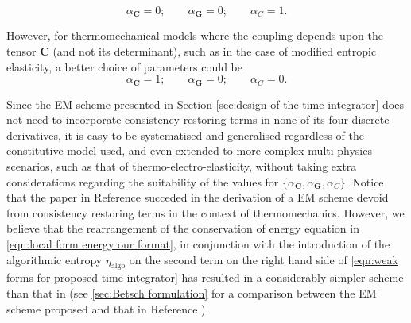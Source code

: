 {{%
\begin{equation}
\alpha_{\boldsymbol{C}}=0;\qquad
\alpha_{\boldsymbol{G}}=0;\qquad
\alpha_{{C}}=1. 
\end{equation}



However, for thermomechanical models where the coupling depends upon the tensor $\boldsymbol{C}$ (and not its determinant), such as in the case of modified entropic elasticity, a better choice of parameters could be
%
\begin{equation}
\alpha_{\boldsymbol{C}}=1;\qquad
\alpha_{\boldsymbol{G}}=0;\qquad
\alpha_{{C}}=0. 
\end{equation}


Since the EM scheme presented in Section \ref{sec:design of the time integrator} does not need to incorporate consistency restoring terms in none of its four discrete derivatives, it is easy to be systematised and generalised regardless of the constitutive model used, and even extended to more complex multi-physics scenarios, such as that of thermo-electro-elasticity, without taking extra considerations regarding the suitability of the values for $\{\alpha_{\boldsymbol{C}},\alpha_{\boldsymbol{G}},\alpha_{C}\}$. Notice that the paper in Reference \cite{Betsch2018Thermo} succeded in the derivation of a EM scheme devoid from consistency restoring terms in the context of thermomechanics. However, we believe that the rearrangement of the conservation of energy equation in \eqref{eqn:local form energy our format}, in conjunction with the introduction of the algorithmic entropy $\eta_{\text{algo}}$ on the second term on the right hand side of \eqref{eqn:weak forms for proposed time integrator} has resulted in a  considerably simpler scheme than that in \cite{Betsch2018Thermo} (see \ref{sec:Betsch formulation} for a comparison between the EM scheme proposed and that in Reference \cite{Betsch2018Thermo}).

\noindent\makebox[\linewidth]{\rule{\textwidth}{0.4pt}}


}}
